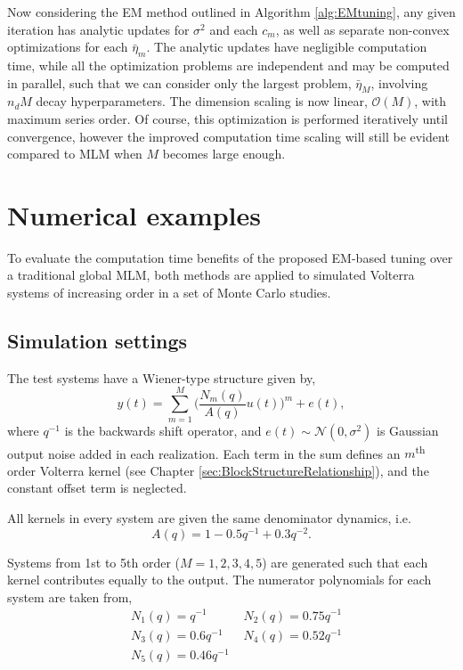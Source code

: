 Now considering the EM method outlined in Algorithm \ref{alg:EMtuning}, any given iteration has analytic updates for $\sigma^2$ and each $c_m$, as well as separate non-convex optimizations for each $\bar{\eta}_m$. The analytic updates have negligible computation time, while all the optimization problems are independent and may be computed in parallel, such that we can consider only the largest problem, $\bar{\eta}_M$, involving $n_d M$ decay hyperparameters. The dimension scaling is now linear, $\mathcal{O}(M)$, with maximum series order. Of course, this optimization is performed iteratively until convergence, however the improved computation time scaling will still be evident compared to MLM when $M$ becomes large enough.

\section{Numerical examples}
\label{sec:NumEx_EM}

To evaluate the computation time benefits of the proposed EM-based tuning over a traditional global MLM, both methods are applied to simulated Volterra systems of increasing order in a set of Monte Carlo studies. 

\subsection{Simulation settings}

The test systems have a Wiener-type structure given by,
\begin{equation}
y(t) = \sum_{m=1}^M \bigg( \frac{N_m(q)}{A(q)}u(t)\bigg)^m +e(t),
\end{equation}   
where $q^{-1}$ is the backwards shift operator, and $e(t) \sim \mathcal{N}(0,\sigma^2)$ is Gaussian output noise added in each realization. Each term in the sum defines an $m$\textsuperscript{th} order Volterra kernel (see Chapter \ref{sec:BlockStructureRelationship}), and the constant offset term is neglected.

All kernels in every system are given the same denominator dynamics, i.e.
\begin{equation}
A(q) = 1 - 0.5q^{-1} + 0.3q^{-2}.
\end{equation}

Systems from 1st to 5th order ($M = 1,2,3,4,5$) are generated such that each kernel contributes equally to the output.  The numerator polynomials for each system are taken from,
\begin{align*}
&N_1(q) = q^{-1} \; \; \; &N_2(q) = 0.75q^{-1} \\
&N_3(q) = 0.6q^{-1} \; \; \; &N_4(q) = 0.52q^{-1}  \\
&N_5(q) = 0.46q^{-1} 
\end{align*}

